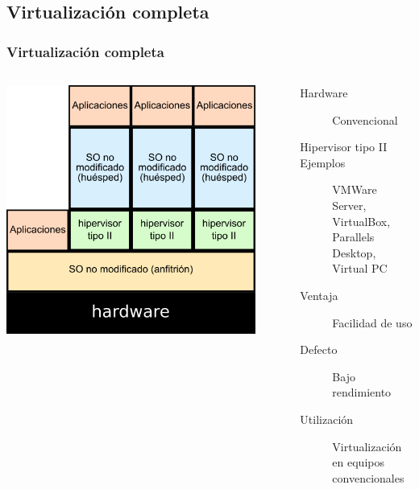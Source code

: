 \documentclass{beamer}
\begin{document}
\subsection{Virtualización completa}
\begin{frame} \frametitle{Virtualización completa}
  \begin{columns}
    \begin{center}
    \includegraphics[width=0.9\textwidth]{img/virt_completa.png}      
    \end{center}
    \begin{description}
    \item[Hardware] Convencional
    \item[Hipervisor tipo II]
    \item[Ejemplos] VMWare Server, VirtualBox,
      Parallels Desktop, Virtual PC
    \item [Ventaja] Facilidad de uso
    \item[Defecto] Bajo rendimiento
    \item[Utilización] Virtualización en equipos convencionales
    \end{description}
  \end{columns}
\end{frame}
\end{document}
